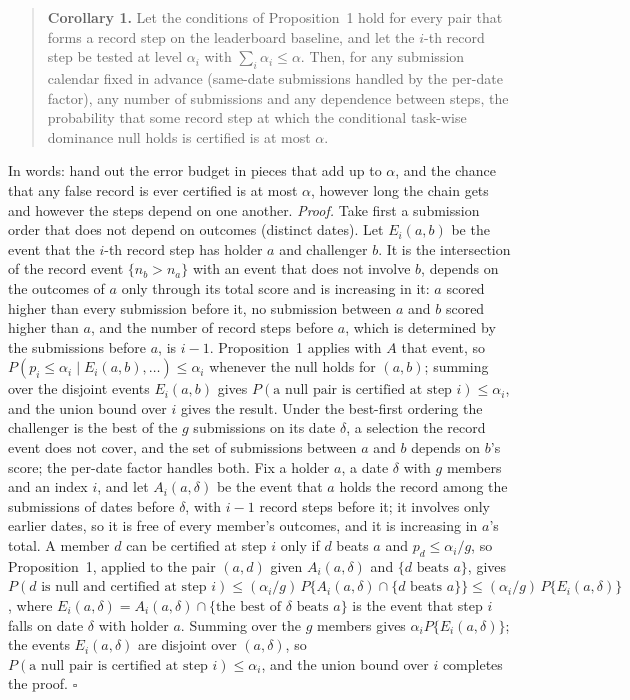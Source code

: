\documentclass[11pt]{article}
\begin{document}
\begin{quote}
\textbf{Corollary 1.}
Let the conditions of Proposition~1 hold for every pair that forms a record step on the leaderboard baseline, and let the $i$-th record step be tested at level $\alpha_i$ with $\sum_i\alpha_i\le\alpha$.
Then, for any submission calendar fixed in advance (same-date submissions handled by the per-date factor), any number of submissions and any dependence between steps, the probability that some record step at which the conditional task-wise dominance null holds is certified is at most $\alpha$.
\end{quote}
In words: hand out the error budget in pieces that add up to $\alpha$, and the chance that any false record is ever certified is at most $\alpha$, however long the chain gets and however the steps depend on one another.
\emph{Proof.}
Take first a submission order that does not depend on outcomes (distinct dates).
Let $E_i(a,b)$ be the event that the $i$-th record step has holder $a$ and challenger $b$.
It is the intersection of the record event $\{n_b>n_a\}$ with an event that does not involve $b$, depends on the outcomes of $a$ only through its total score and is increasing in it: $a$ scored higher than every submission before it, no submission between $a$ and $b$ scored higher than $a$, and the number of record steps before $a$, which is determined by the submissions before $a$, is $i-1$.
Proposition~1 applies with $A$ that event, so $P(p_i\le\alpha_i\mid E_i(a,b),\ldots)\le\alpha_i$ whenever the null holds for $(a,b)$; summing over the disjoint events $E_i(a,b)$ gives $P(\text{a null pair is certified at step } i)\le\alpha_i$, and the union bound over $i$ gives the result.
Under the best-first ordering the challenger is the best of the $g$ submissions on its date $\delta$, a selection the record event does not cover, and the set of submissions between $a$ and $b$ depends on $b$'s score; the per-date factor handles both.
Fix a holder $a$, a date $\delta$ with $g$ members and an index $i$, and let $A_i(a,\delta)$ be the event that $a$ holds the record among the submissions of dates before $\delta$, with $i-1$ record steps before it; it involves only earlier dates, so it is free of every member's outcomes, and it is increasing in $a$'s total.
A member $d$ can be certified at step $i$ only if $d$ beats $a$ and $p_d\le\alpha_i/g$, so Proposition~1, applied to the pair $(a,d)$ given $A_i(a,\delta)$ and $\{d\text{ beats }a\}$, gives $P(d\text{ is null and certified at step } i)\le(\alpha_i/g)\,P\{A_i(a,\delta)\cap\{d\text{ beats }a\}\}\le(\alpha_i/g)\,P\{E_i(a,\delta)\}$, where $E_i(a,\delta)=A_i(a,\delta)\cap\{\text{the best of }\delta\text{ beats }a\}$ is the event that step $i$ falls on date $\delta$ with holder $a$.
Summing over the $g$ members gives $\alpha_i P\{E_i(a,\delta)\}$; the events $E_i(a,\delta)$ are disjoint over $(a,\delta)$, so $P(\text{a null pair is certified at step } i)\le\alpha_i$, and the union bound over $i$ completes the proof. $\square$
\end{document}
